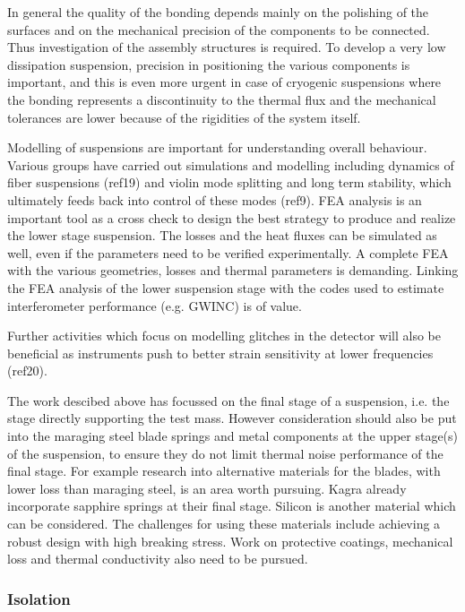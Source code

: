 In general the quality of the bonding depends mainly on the polishing of the surfaces and on the mechanical precision of the components to be connected. Thus investigation of the assembly structures is required. To develop a very low dissipation suspension, precision in positioning the various components is important, and this is even more urgent in case of cryogenic suspensions where the bonding represents a discontinuity to the thermal flux and the mechanical tolerances are lower because of the rigidities of the system itself.



Modelling of suspensions are important for understanding overall behaviour. Various groups have carried out simulations and modelling including dynamics of fiber suspensions (ref19) and violin mode splitting and long term stability, which ultimately feeds back into control of these modes (ref9). FEA analysis is an important tool as a cross check to design the best strategy to produce and realize the lower stage suspension. The losses and the heat fluxes can be simulated as well, even if the parameters need to be verified experimentally. A complete FEA with the various geometries, losses and thermal parameters is demanding. Linking the FEA analysis of the lower suspension stage with the codes used to estimate interferometer performance (e.g. GWINC) is of value.

Further activities which focus on modelling glitches in the detector will also be beneficial as instruments push to better strain sensitivity at lower frequencies (ref20).

The work descibed above has focussed on the final stage of a suspension, i.e. the stage directly supporting the test mass. However consideration should also be put into the maraging steel blade springs and metal components at the upper stage(s) of the suspension, to ensure they do not limit thermal noise performance of the final stage. For example research into alternative materials for the blades, with lower loss than maraging steel, is an area worth pursuing. Kagra already incorporate sapphire springs at their final stage. Silicon is another material which can be considered. The challenges for using these materials include achieving a robust design with high breaking stress. Work on protective coatings, mechanical loss and thermal conductivity also need to be pursued.

\subsubsection{Isolation}
